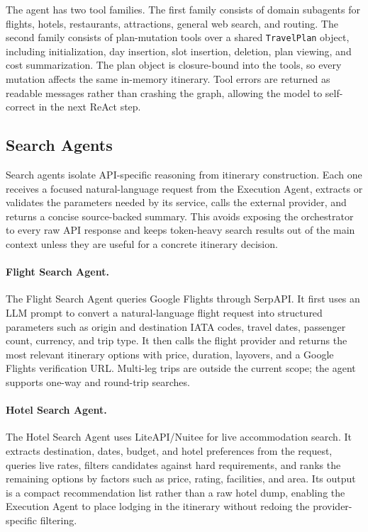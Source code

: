 \documentclass[a4paper,oneside,bibliography=totoc]{scrbook}
\begin{document}
The agent has two tool families. The first family consists of domain subagents
for flights, hotels, restaurants, attractions, general web search, and routing.
The second family consists of plan-mutation tools over a shared
\texttt{TravelPlan} object, including initialization, day insertion, slot
insertion, deletion, plan viewing, and cost summarization. The plan object is
closure-bound into the tools, so every mutation affects the same in-memory
itinerary. Tool errors are returned as readable messages rather than crashing
the graph, allowing the model to self-correct in the next ReAct step.

\subsection{Search Agents}

Search agents isolate API-specific reasoning from itinerary construction. Each
one receives a focused natural-language request from the Execution Agent,
extracts or validates the parameters needed by its service, calls the external
provider, and returns a concise source-backed summary. This avoids exposing the
orchestrator to every raw API response and keeps token-heavy search results out
of the main context unless they are useful for a concrete itinerary decision.

\paragraph{Flight Search Agent.}
The Flight Search Agent queries Google Flights through SerpAPI. It first uses
an LLM prompt to convert a natural-language flight request into structured
parameters such as origin and destination IATA codes, travel dates, passenger
count, currency, and trip type. It then calls the flight provider and returns
the most relevant itinerary options with price, duration, layovers, and a
Google Flights verification URL. Multi-leg trips are outside the current scope;
the agent supports one-way and round-trip searches.

\paragraph{Hotel Search Agent.}
The Hotel Search Agent uses LiteAPI/Nuitee for live accommodation search. It
extracts destination, dates, budget, and hotel preferences from the request,
queries live rates, filters candidates against hard requirements, and ranks the
remaining options by factors such as price, rating, facilities, and area. Its
output is a compact recommendation list rather than a raw hotel dump, enabling
the Execution Agent to place lodging in the itinerary without redoing the
provider-specific filtering.
\end{document}
